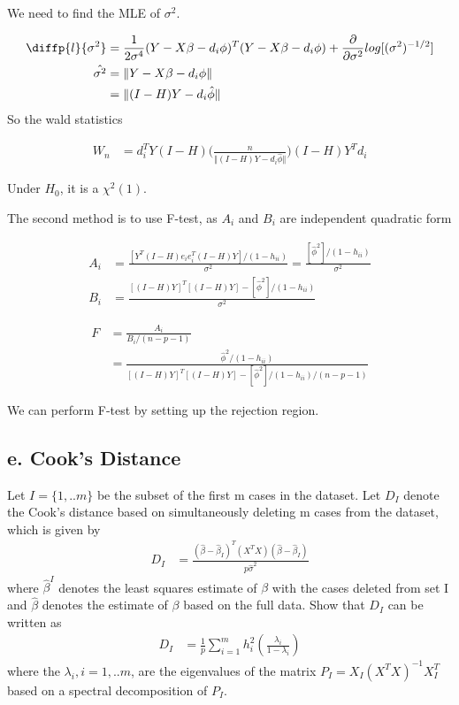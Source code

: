 \documentclass[11pt]{article} %
\begin{document}
We need to find the MLE of $\sigma^2$.

\begin{align*}
	\diffp{l}{{\sigma^2}} &= \frac{1}{2 \sigma^4} (Y- X\beta -d_i \phi)^T (Y- X\beta -d_i \phi) +
	\frac{\partial}{\partial \sigma^2} log [(\sigma^2)^{-1/2}] \\
	\hat{\sigma^2} &= \Vert Y- X \beta -d_i \phi \Vert \\
	&= \Vert (I-H)Y -d_i \hat{\phi} \Vert
\end{align*}
So the wald statistics

\begin{align*}
	W_n &= d_i^T Y(I-H) \Bigg( \frac{n}{ \Vert (I-H)Y -d_i \hat{\phi} \Vert} \Bigg) (I-H) Y^T d_i
\end{align*}

Under $H_0$, it is a $\chi^2(1)$. 



The second method is to use F-test, as $A_i$ and $B_i$ are independent quadratic form 

\begin{align*}
	A_i & = \frac{ [Y^T (I-H) e_i e_i^T (I-H) Y]/(1-h_{ii})}{\sigma^2} = \frac{ [\hat{\phi}^2]/(1-h_{ii})}{\sigma^2}\\
	B_i &=  \frac{ [(I-H)Y ]^T[(I-H)Y ]- [\hat{\phi}^2]/(1-h_{ii})}{\sigma^2} 
\end{align*} 

\begin{align*}
	F &= \frac{A_i}{B_i/(n-p-1)} \\
	&= \frac{\hat{\phi}^2/(1-h_{ii})}{[(I-H)Y ]^T[(I-H)Y ]- [\hat{\phi}^2]/(1-h_{ii})/(n-p-1)} 
\end{align*}

We can perform F-test by setting up the rejection region.

\subsection{e. Cook's Distance}
 Let $I = \{ 1,.. m\}$ be the subset of the first m cases in the dataset. Let $D_I$ denote the Cook's distance based on simultaneously deleting m cases from the dataset, which is given by
\begin{align*}
	D_I & = \frac{(\hat{\beta} - \hat{\beta}_I)^T (X^T X) (\hat{\beta} - \hat{\beta}_I)}{p \hat{\sigma}^2}
\end{align*} 
where $\hat{\beta}^I$ denotes the least squares estimate of $\beta$ with the cases deleted from set I and $\hat{\beta}$ denotes the estimate of $\beta$ based on the full data. Show that $D_I$ can be written as 
\begin{align*}
	D_I & = \frac{1}{p} \sum_{i=1}^m h_i^2 \left( \frac{\lambda_i}{1- \lambda_i} \right)
\end{align*} 	
where the $\lambda_i, i=1,..m$, are the eigenvalues of the matrix $P_I = X_I (X^T X)^{-1} X_I^T$ based on a spectral decomposition of $P_I$.
 
\end{document}
